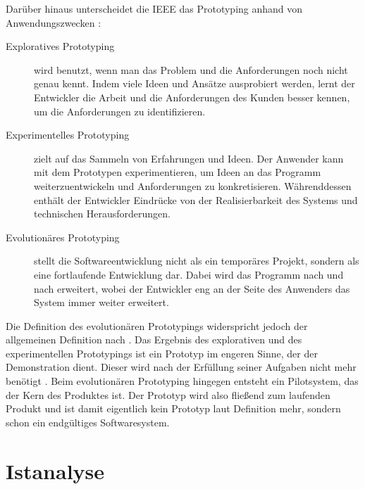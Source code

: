 \documentclass [12pt, a4paper, oneside, titlepage, ngerman]{article}
\begin{document}
\noindent Darüber hinaus unterscheidet die IEEE das Prototyping anhand von Anwendungszwecken \cite[vgl.][S.826]{ieeeprot}: 
\begin{description}
\item[Exploratives Prototyping] wird benutzt, wenn man das Problem und die Anforderungen noch nicht genau kennt. Indem viele Ideen und Ansätze ausprobiert werden, lernt der Entwickler die Arbeit und die Anforderungen des Kunden besser kennen, um die Anforderungen zu identifizieren.
\item[Experimentelles Prototyping] zielt auf das Sammeln von Erfahrungen und Ideen. Der Anwender kann mit dem Prototypen experimentieren, um Ideen an das Programm weiterzuentwickeln und Anforderungen zu konkretisieren. Währenddessen enthält der Entwickler Eindrücke von der Realisierbarkeit des Systems und technischen Herausforderungen.
\item[Evolutionäres Prototyping] stellt die Softwareentwicklung nicht als ein temporäres Projekt, sondern als eine fortlaufende Entwicklung dar. Dabei wird das Programm nach und nach erweitert, wobei der Entwickler eng an der Seite des Anwenders das System immer weiter erweitert.
\end{description}
Die Definition des evolutionären Prototypings widerspricht jedoch der allgemeinen Definition nach \cite{gabler}. Das Ergebnis des explorativen und des experimentellen Prototypings ist ein Prototyp im engeren Sinne, der der Demonstration dient. Dieser wird nach der Erfüllung seiner Aufgaben nicht mehr benötigt \cite[vgl.][S.21]{liggesmeyer2012}. Beim evolutionären Prototyping hingegen entsteht ein Pilotsystem, das der Kern des Produktes ist. Der Prototyp wird also fließend zum laufenden Produkt \cite[vgl.][S.24]{liggesmeyer2012} und ist damit eigentlich kein Prototyp laut Definition mehr, sondern schon ein endgültiges Softwaresystem.

\newpage

\section {Istanalyse}
\end{document}
